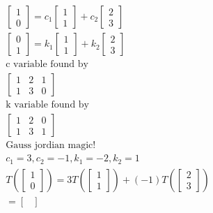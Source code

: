 \documentclass[12pt, a4paper]{article}
\begin{document}
				
			\begin{align*}
				\begin{bmatrix}
					1 \\
					0
				\end{bmatrix}=c_1\begin{bmatrix}
					1 \\
					1
				\end{bmatrix}+c_2\begin{bmatrix}
					2 \\
					3
				\end{bmatrix}\\
				\begin{bmatrix}
					0 \\
					1
				\end{bmatrix}=k_1\begin{bmatrix}
					1 \\
					1
				\end{bmatrix}+k_2\begin{bmatrix}
					2 \\
					3
				\end{bmatrix}\\
				\text{c variable found by}\\
				\begin{bmatrix}
					1 & 2 & 1 \\
					1 & 3 & 0
				\end{bmatrix}\\
				\text{k variable found by}\\
				\begin{bmatrix}
					1 & 2 & 0 \\
					1 & 3 & 1
				\end{bmatrix}\\
				\text{Gauss jordian magic!}\\
				c_1=3, c_2=-1, k_1=-2,k_2=1\\
				T(
				\begin{bmatrix}
					1 \\
					0
				\end{bmatrix})=3T(
				\begin{bmatrix}
					1 \\
					1
				\end{bmatrix})+(-1)T(
				\begin{bmatrix}
					2 \\
					3
				\end{bmatrix})\\
				=\begin{bmatrix}

\end{bmatrix}
\end{align*}
\end{document}

